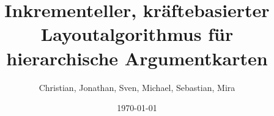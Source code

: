 \begin{titlepage}
\author{Christian, Jonathan, Sven, Michael, Sebastian, Mira}
\date{\today}

\title{\vspace{3cm}Inkrementeller, kräftebasierter Layoutalgorithmus für hierarchische Argumentkarten}
\maketitle
\end{titlepage}
